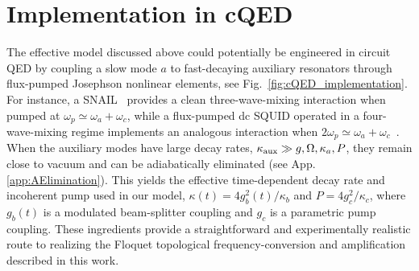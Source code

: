 \documentclass[a4paper,twocolumn,floatfix,10pt,superscriptaddress]%
{quantumarticle}
\begin{document}
\section{Implementation in cQED}\label{Sec::IMP}
The effective model discussed above could potentially be engineered in circuit QED by coupling a slow mode $a$ to fast-decaying auxiliary resonators through flux-pumped Josephson nonlinear elements, see Fig.~\ref{fig:cQED_implementation}. For instance, a SNAIL~\cite{Frattini2018,Sivak2019} provides a clean three-wave-mixing interaction when pumped at $\omega_p \simeq \omega_a + \omega_c$, while a flux-pumped dc SQUID operated in a four-wave-mixing regime implements an analogous interaction when $2\omega_p \simeq \omega_a + \omega_c$~\cite{CastellanosBeltran2008,Planat2019}. When the auxiliary modes have large decay rates, $\kappa_{\rm aux}\gg g,\Omega,\kappa_a,P$, they remain close to vacuum and can be adiabatically eliminated (see App. \ref{app:AElimination}). This yields the effective time-dependent decay rate and incoherent pump used in our model, 
$\kappa(t)=4g_b^2(t)/\kappa_b$ and $P=4 g_c^2/\kappa_c$, where $g_b(t)$ is a modulated beam-splitter coupling and $g_c$ is a parametric pump coupling. These ingredients provide a straightforward and experimentally realistic route to realizing the Floquet topological frequency-conversion and amplification described in this work.
\end{document}
